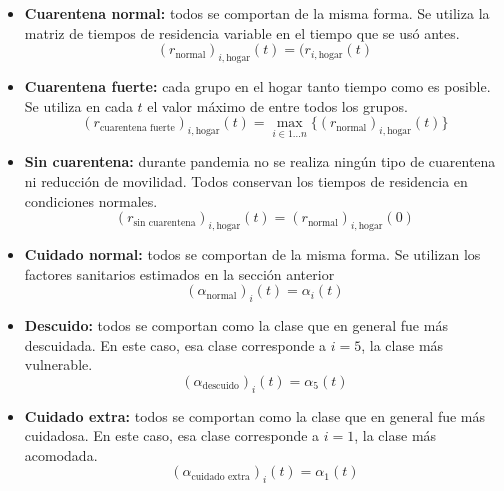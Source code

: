 \begin{itemize}
\item \textbf{Cuarentena normal:} todos se comportan de la misma forma. Se utiliza la matriz de tiempos de residencia variable en el tiempo que se usó antes.
\[(r_{\text{normal}})_{i, \text{hogar}}(t) =  (r_{i, \text{hogar}}(t)\]
\item \textbf{Cuarentena fuerte:} cada grupo en el hogar tanto tiempo como es posible. Se utiliza en cada \(t\) el valor máximo de entre todos los grupos.
\[(r_{\text{cuarentena fuerte}})_{i, \text{hogar}}(t) = \max_{i \in 1\dots n} \big\{ (r_{\text{normal}})_{i, \text{hogar}}(t) \big\}\]
\item \textbf{Sin cuarentena:} durante pandemia no se realiza ningún tipo de cuarentena ni reducción de movilidad. Todos conservan los tiempos de residencia en condiciones normales.\[(r_{\text{sin cuarentena}})_{i, \text{hogar}}(t) =  (r_{\text{normal}})_{i, \text{hogar}}(0) \]
\end{itemize}

\begin{itemize}
    \item \textbf{Cuidado normal:} todos se comportan de la misma forma. Se utilizan los factores sanitarios estimados en la sección anterior
    \[ (\alpha_{\text{normal}})_{i}(t) = \alpha_i(t)\]
    \item \textbf{Descuido:} todos se comportan como la clase que en general fue más descuidada. En este caso, esa clase corresponde a \(i = 5\), la clase más vulnerable. 
    \[ (\alpha_{\text{descuido}})_{i}(t) = \alpha_5(t)\]
    \item \textbf{Cuidado extra:} todos se comportan como la clase que en general fue más cuidadosa. En este caso, esa clase corresponde a \(i = 1\), la clase más acomodada. 
    \[ (\alpha_{\text{cuidado extra}})_{i}(t) = \alpha_1(t)\]
\end{itemize}
